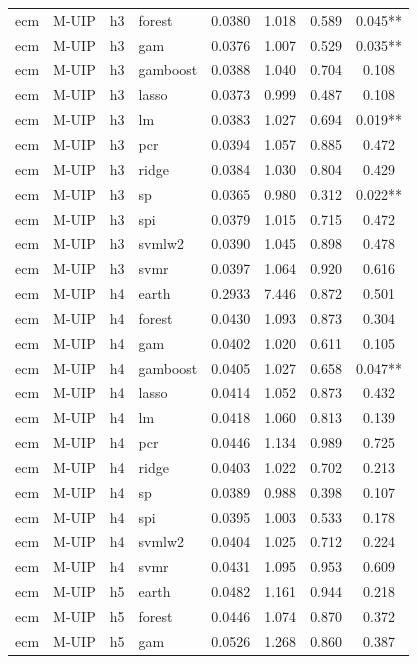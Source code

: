 \begin{ThreePartTable}
\begin{longtable}[t]{llclcccc}
ecm & M-UIP & h3 & forest & 0.0380 & 1.018 & 0.589 & 0.045**\\
ecm & M-UIP & h3 & gam & 0.0376 & 1.007 & 0.529 & 0.035**\\
ecm & M-UIP & h3 & gamboost & 0.0388 & 1.040 & 0.704 & 0.108\\
ecm & M-UIP & h3 & lasso & 0.0373 & 0.999 & 0.487 & 0.108\\
ecm & M-UIP & h3 & lm & 0.0383 & 1.027 & 0.694 & 0.019**\\
ecm & M-UIP & h3 & pcr & 0.0394 & 1.057 & 0.885 & 0.472\\
ecm & M-UIP & h3 & ridge & 0.0384 & 1.030 & 0.804 & 0.429\\
ecm & M-UIP & h3 & sp & 0.0365 & 0.980 & 0.312 & 0.022**\\
ecm & M-UIP & h3 & spi & 0.0379 & 1.015 & 0.715 & 0.472\\
ecm & M-UIP & h3 & svmlw2 & 0.0390 & 1.045 & 0.898 & 0.478\\
ecm & M-UIP & h3 & svmr & 0.0397 & 1.064 & 0.920 & 0.616\\
\addlinespace
ecm & M-UIP & h4 & earth & 0.2933 & 7.446 & 0.872 & 0.501\\
ecm & M-UIP & h4 & forest & 0.0430 & 1.093 & 0.873 & 0.304\\
ecm & M-UIP & h4 & gam & 0.0402 & 1.020 & 0.611 & 0.105\\
ecm & M-UIP & h4 & gamboost & 0.0405 & 1.027 & 0.658 & 0.047**\\
ecm & M-UIP & h4 & lasso & 0.0414 & 1.052 & 0.873 & 0.432\\
ecm & M-UIP & h4 & lm & 0.0418 & 1.060 & 0.813 & 0.139\\
ecm & M-UIP & h4 & pcr & 0.0446 & 1.134 & 0.989 & 0.725\\
ecm & M-UIP & h4 & ridge & 0.0403 & 1.022 & 0.702 & 0.213\\
ecm & M-UIP & h4 & sp & 0.0389 & 0.988 & 0.398 & 0.107\\
ecm & M-UIP & h4 & spi & 0.0395 & 1.003 & 0.533 & 0.178\\
ecm & M-UIP & h4 & svmlw2 & 0.0404 & 1.025 & 0.712 & 0.224\\
ecm & M-UIP & h4 & svmr & 0.0431 & 1.095 & 0.953 & 0.609\\
\addlinespace
ecm & M-UIP & h5 & earth & 0.0482 & 1.161 & 0.944 & 0.218\\
ecm & M-UIP & h5 & forest & 0.0446 & 1.074 & 0.870 & 0.372\\
ecm & M-UIP & h5 & gam & 0.0526 & 1.268 & 0.860 & 0.387\\

\end{longtable}
\end{ThreePartTable}
